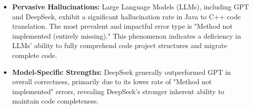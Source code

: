 \begin{itemize}[leftmargin=1.5em]
    \item \textbf{Pervasive Hallucinations: }Large Language Models (LLMs), including GPT and DeepSeek, exhibit a significant hallucination rate in Java to C++ code translation. The most prevalent and impactful error type is "Method not implemented (entirely missing)." This phenomenon indicates a deficiency in LLMs' ability to fully comprehend code project structures and migrate complete code.
    \item \textbf{Model-Specific Strengths: }DeepSeek generally outperformed GPT in overall correctness, primarily due to its lower rate of "Method not implemented" errors, revealing DeepSeek's stronger inherent ability to maintain code completeness.
\end{itemize}


